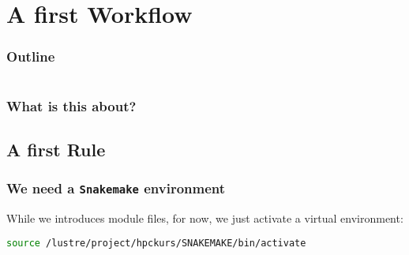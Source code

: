 \section{A first Workflow}

\begin{frame}
    \frametitle{Outline}
    \begin{columns}[t]
        \begin{column}{.5\textwidth}
            \tableofcontents[sections={1-9},currentsection]
        \end{column}
        \begin{column}{.5\textwidth}
            \tableofcontents[sections={10-18},currentsection]
        \end{column}
    \end{columns}
\end{frame}

\begin{frame}
  \frametitle{What is this about?}
\end{frame}


\subsection{A first Rule}

\begin{frame}[fragile]
  \frametitle{We need a \texttt{Snakemake} environment}
  While we introduces module files, for now, we just activate a virtual environment:
  \begin{lstlisting}[language=Bash, style=Shell]
source /lustre/project/hpckurs/SNAKEMAKE/bin/activate
  \end{lstlisting}
\end{frame}

